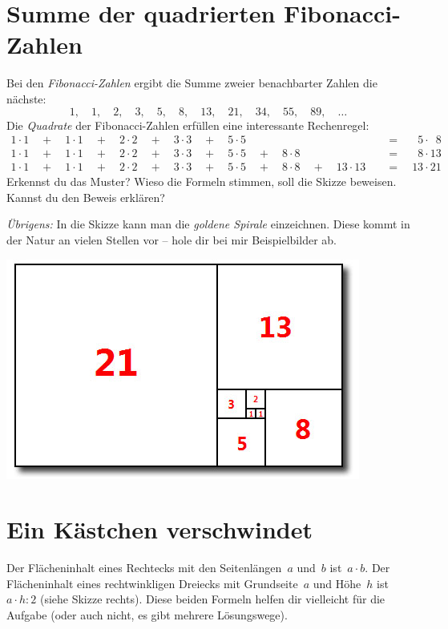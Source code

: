 \documentclass{../zirkelblatt}
\begin{document}
\section*{Summe der quadrierten Fibonacci-Zahlen}
Bei den \emph{Fibonacci-Zahlen} ergibt die Summe zweier benachbarter Zahlen die
nächste:
\[ 1,\quad 1,\quad 2,\quad 3,\quad 5,\quad 8,\quad 13,\quad 21,\quad 34,\quad 55,\quad 89,\quad \ldots \]
Die \emph{Quadrate} der Fibonacci-Zahlen erfüllen eine interessante Rechenregel:
\begin{align*}
  1\cdot1 \quad+\quad 1\cdot1 \quad+\quad 2\cdot2 \quad+\quad 3\cdot3 \quad+\quad 5\cdot5 \phantom{{} \quad+\quad 8\cdot8 \quad+\quad 13\cdot13}
    &{\quad}=\quad \phantom{0}5 \cdot \phantom{0}8 \\
  1\cdot1 \quad+\quad 1\cdot1 \quad+\quad 2\cdot2 \quad+\quad 3\cdot3 \quad+\quad 5\cdot5 \quad+\quad 8\cdot8 \phantom{{} \quad+\quad 13\cdot13}
    &{\quad}=\quad \phantom{0}8 \cdot 13 \\
  1\cdot1 \quad+\quad 1\cdot1 \quad+\quad 2\cdot2 \quad+\quad 3\cdot3 \quad+\quad 5\cdot5 \quad+\quad 8\cdot8 \quad+\quad 13\cdot13
    &{\quad}=\quad 13 \cdot 21
\end{align*}
Erkennst du das Muster? Wieso die Formeln stimmen, soll die Skizze beweisen.
Kannst du den Beweis erklären?

\emph{Übrigens:} In die Skizze kann man die \emph{goldene Spirale} einzeichnen.
Diese kommt in der Natur an vielen Stellen vor -- hole dir bei mir Beispielbilder ab.
\begin{center}
\includegraphics[scale=0.7]{fibonacci-quadrate}
\end{center}

\vfill
\section*{Ein Kästchen verschwindet}
\begin{floatingfigure}[r]{3.5cm}
  \vspace{-0.3cm}
  \scalebox{0.4}{}
\end{floatingfigure}
Der Flächeninhalt eines Rechtecks mit den Seitenlängen~$a$ und~$b$ ist~$a \cdot
b$. Der Flächeninhalt eines rechtwinkligen Dreiecks mit Grundseite~$a$ und
Höhe~$h$ ist~$a \cdot h : 2$ (siehe Skizze rechts). Diese beiden Formeln helfen
dir vielleicht für die Aufgabe (oder auch nicht, es gibt mehrere Lösungswege).
\end{document}
